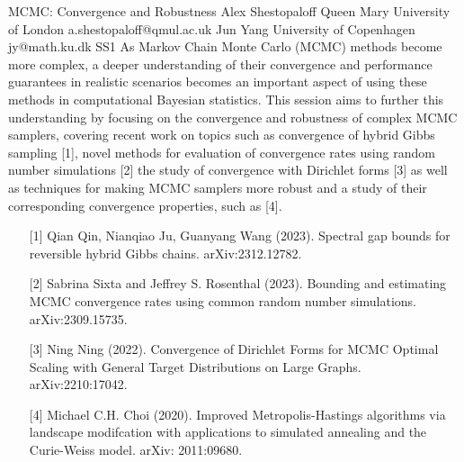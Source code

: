 \documentclass[12pt,a4paper,figuresright]{book}
\begin{document}
\cleardoublepage
\begin{session}
 {MCMC: Convergence and Robustness}%
 {Alex Shestopaloff}%
 {Queen Mary University of London}%
 {a.shestopaloff@qmul.ac.uk}%
 {Jun Yang}%
 {University of Copenhagen}%
 {jy@math.ku.dk}%
 {SS1}%
 {}%
 As Markov Chain Monte Carlo (MCMC) methods become more complex, a deeper understanding of their convergence and performance guarantees in realistic scenarios becomes an important aspect of using these methods in computational Bayesian statistics. This session aims to further this understanding by focusing on the convergence and robustness of complex MCMC samplers, covering recent work on topics such as convergence of hybrid Gibbs sampling [1], novel methods for evaluation of convergence rates using random number simulations [2] the study of convergence with Dirichlet forms [3] as well as techniques for making MCMC samplers more robust and a study of their corresponding convergence properties, such as [4].

\begin{enumerate}
	\item[{[1]}] Qian Qin, Nianqiao Ju, Guanyang Wang (2023). Spectral gap bounds for reversible hybrid Gibbs chains. arXiv:2312.12782.
	\item[{[2]}] Sabrina Sixta and Jeffrey S. Rosenthal (2023). Bounding and estimating MCMC convergence rates using common random number simulations. arXiv:2309.15735.
	\item[{[3]}] Ning Ning (2022). Convergence of Dirichlet Forms for MCMC Optimal Scaling with General Target Distributions on Large Graphs. arXiv:2210:17042.
	\item[{[4]}] Michael C.H. Choi (2020). Improved Metropolis-Hastings algorithms via landscape modifcation with applications to simulated annealing and the Curie-Weiss model. arXiv: 2011:09680.
\end{enumerate}
\end{session}
\end{document}
